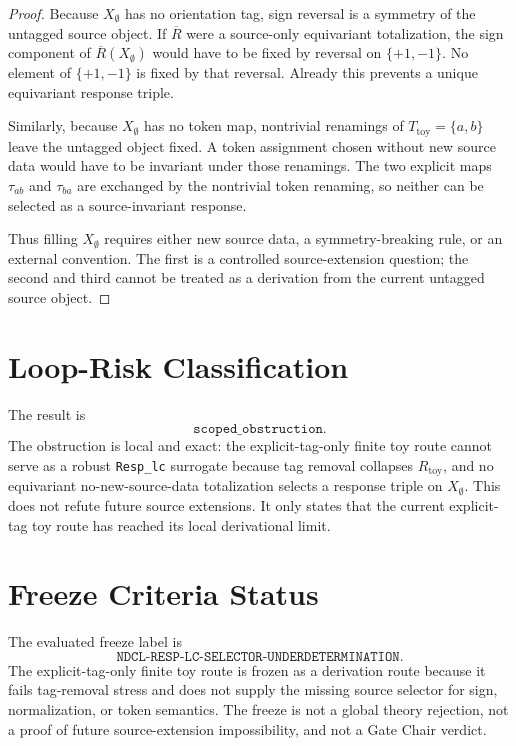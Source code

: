 \documentclass[11pt]{article}
\begin{document}
\begin{proof}
Because \(X_{\emptyset}\) has no orientation tag, sign reversal is a
symmetry of the untagged source object. If \(\overline{R}\) were a
source-only equivariant totalization, the sign component of
\(\overline{R}(X_{\emptyset})\) would have to be fixed by reversal on
\(\{+1,-1\}\). No element of \(\{+1,-1\}\) is fixed by that reversal.
Already this prevents a unique equivariant response triple.

Similarly, because \(X_{\emptyset}\) has no token map, nontrivial
renamings of \(T_{\mathrm{toy}}=\{a,b\}\) leave the untagged object
fixed. A token assignment chosen without new source data would have to
be invariant under those renamings. The two explicit maps
\(\tau_{ab}\) and \(\tau_{ba}\) are exchanged by the nontrivial token
renaming, so neither can be selected as a source-invariant response.

Thus filling \(X_{\emptyset}\) requires either new source data, a
symmetry-breaking rule, or an external convention. The first is a
controlled source-extension question; the second and third cannot be
treated as a derivation from the current untagged source object.
\end{proof}

\section{Loop-Risk Classification}

The result is
\[
\texttt{scoped\_obstruction}.
\]
The obstruction is local and exact: the explicit-tag-only finite toy
route cannot serve as a robust \texttt{Resp\_lc} surrogate because tag
removal collapses \(R_{\mathrm{toy}}\), and no equivariant
no-new-source-data totalization selects a response triple on
\(X_{\emptyset}\). This does not refute future source extensions. It
only states that the current explicit-tag toy route has reached its
local derivational limit.

\section{Freeze Criteria Status}

The evaluated freeze label is
\[
\texttt{NDCL-RESP-LC-SELECTOR-UNDERDETERMINATION}.
\]
The explicit-tag-only finite toy route is frozen as a derivation route
because it fails tag-removal stress and does not supply the missing
source selector for sign, normalization, or token semantics. The freeze
is not a global theory rejection, not a proof of future source-extension
impossibility, and not a Gate Chair verdict.
\end{document}
